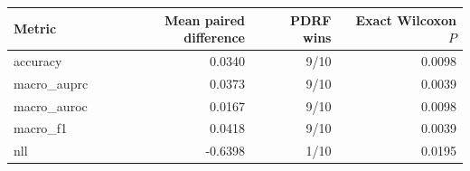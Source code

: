 \begin{tabular}{lrrr}
\toprule
Metric & Mean paired difference & PDRF wins & Exact Wilcoxon $P$\\
\midrule
accuracy & 0.0340 & 9/10 & 0.0098\\
macro\_auprc & 0.0373 & 9/10 & 0.0039\\
macro\_auroc & 0.0167 & 9/10 & 0.0098\\
macro\_f1 & 0.0418 & 9/10 & 0.0039\\
nll & -0.6398 & 1/10 & 0.0195\\
\bottomrule
\end{tabular}
